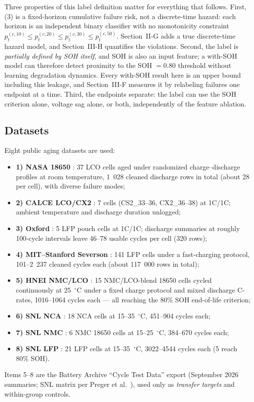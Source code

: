 \documentclass[preprint,12pt]{elsarticle}
\begin{document}
Three properties of this label definition matter for everything that follows. First, (3) is a fixed-horizon cumulative failure risk, not a discrete-time hazard: each horizon is an independent binary classifier with no monotonicity constraint $p_t^{(c,10)}\le p_t^{(c,20)}\le p_t^{(c,30)}\le p_t^{(c,50)}$. Section~II-G adds a true discrete-time hazard model, and Section~III-H quantifies the violations. Second, the label is \emph{partially defined by SOH itself}, and SOH is also an input feature; a with-SOH model can therefore detect proximity to the SOH $=0.80$ threshold without learning degradation dynamics. Every with-SOH result here is an upper bound including this leakage, and Section~III-F measures it by relabeling failures one endpoint at a time. Third, the endpoints separate: the label can use the SOH criterion alone, voltage sag alone, or both, independently of the feature ablation.

\subsection{Datasets}
Eight public aging datasets are used:
\begin{itemize}
\item \textbf{1) NASA 18650} \cite{saha2007battery}: 37 LCO cells aged under randomized charge--discharge profiles at room temperature, 1~028 cleaned discharge rows in total (about 28 per cell), with diverse failure modes;
\item \textbf{2) CALCE LCO/CX2} \cite{calce2023battery}: 7 cells (CS2\_33--36, CX2\_36--38) at 1C/1C; ambient temperature and discharge duration unlogged;
\item \textbf{3) Oxford} \cite{birkl2017oxford}: 5 LFP pouch cells at 1C/1C; discharge summaries at roughly 100-cycle intervals leave 46--78 usable cycles per cell (320 rows);
\item \textbf{4) MIT--Stanford Severson} \cite{severson2019data,attia2020closedloop}: 141 LFP cells under a fast-charging protocol, 101--2~237 cleaned cycles each (about 117~000 rows in total);
\item \textbf{5) HNEI NMC/LCO} \cite{batteryarchive2023}: 15 NMC/LCO-blend 18650 cells cycled continuously at 25~$^\circ$C under a fixed charge protocol and mixed discharge C-rates, 1016--1064 cycles each --- all reaching the 80\% SOH end-of-life criterion;
\item \textbf{6) SNL NCA} \cite{batteryarchive2023,preger2020degradation}: 18 NCA cells at 15--35~$^\circ$C, 451--904 cycles each;
\item \textbf{7) SNL NMC} \cite{batteryarchive2023,preger2020degradation}: 6 NMC 18650 cells at 15--25~$^\circ$C, 384--670 cycles each;
\item \textbf{8) SNL LFP} \cite{batteryarchive2023,preger2020degradation}: 21 LFP cells at 15--35~$^\circ$C, 3022--4544 cycles each (5 reach 80\% SOH).
\end{itemize}
Items 5--8 are the Battery Archive ``Cycle Test Data'' export \cite{batteryarchive2023} (September 2026 summaries; SNL matrix per Preger et al.~\cite{preger2020degradation}), used only as \emph{transfer targets} and within-group controls.
\end{document}
